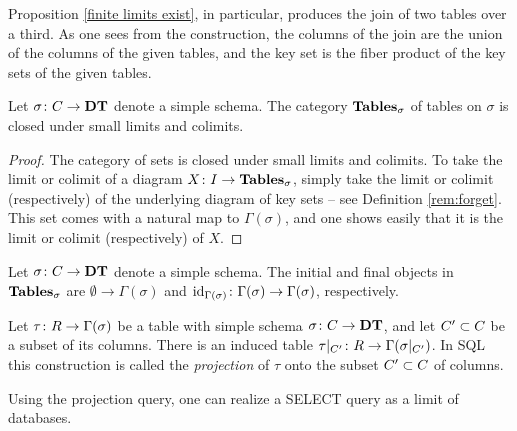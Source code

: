 \documentclass{amsart}
\begin{document}
Proposition \ref{finite limits exist}, in particular, produces the join of two tables over a third.  As one sees from the construction, the columns of the join are the union of the columns of the given tables, and the key set is the fiber product of the key sets of the given tables.

\begin{lemma}

Let $\sigma\taking C\to\DT$ denote a simple schema.  The category $\Tables_\sigma$ of tables on $\sigma$ is closed under small limits and colimits.

\end{lemma}

\begin{proof}

The category of sets is closed under small limits and colimits.  To take the limit or colimit of a diagram $X\taking I\to\Tables_\sigma$, simply take the limit or colimit (respectively) of the underlying diagram of key sets -- see Definition \ref{rem:forget}.  This set comes with a natural map to $\Gamma(\sigma)$, and one shows easily that it is the limit or colimit (respectively) of $X$.

\end{proof}

\begin{example}\label{ex:initial and final over sigma}

Let $\sigma\taking C\to\DT$ denote a simple schema.  The initial and final objects in $\Tables_\sigma$ are $\emptyset\to\Gamma(\sigma)$ and $\id_{\Gamma(\sigma)}\taking\Gamma(\sigma)\to\Gamma(\sigma)$, respectively.

\end{example}

\begin{construction}

Let $\tau\taking R\to\Gamma(\sigma)$ be a table with simple schema $\sigma\taking C\to\DT$, and let $C'\ss C$ be a subset of its columns.  There is an induced table $\tau|_{C'}\taking R\to\Gamma(\sigma|_{C'})$.  In SQL this construction is called the {\em projection} of $\tau$ onto the subset $C'\ss C$ of columns.

\end{construction}

Using the projection query, one can realize a SELECT query as a limit of databases.  
\end{document}
